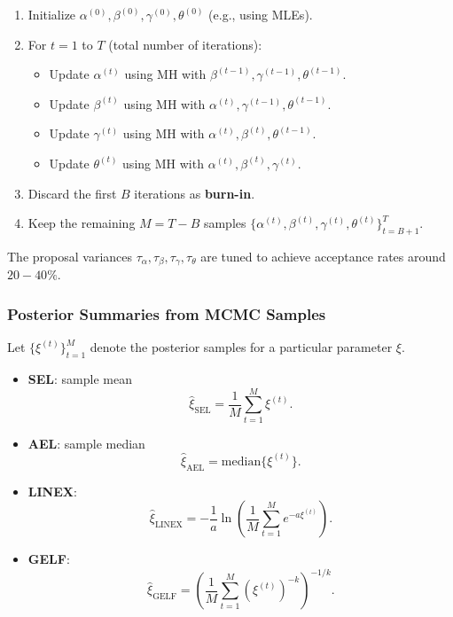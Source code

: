 \documentclass[12pt]{article}
\begin{document}
\begin{enumerate}
    \item Initialize \(\alpha^{(0)},\beta^{(0)},\gamma^{(0)},\theta^{(0)}\) (e.g., using MLEs).
    \item For \(t = 1\) to \(T\) (total number of iterations):
        \begin{itemize}
            \item Update \(\alpha^{(t)}\) using MH with \(\beta^{(t-1)},\gamma^{(t-1)},\theta^{(t-1)}\).
            \item Update \(\beta^{(t)}\) using MH with \(\alpha^{(t)},\gamma^{(t-1)},\theta^{(t-1)}\).
            \item Update \(\gamma^{(t)}\) using MH with \(\alpha^{(t)},\beta^{(t)},\theta^{(t-1)}\).
            \item Update \(\theta^{(t)}\) using MH with \(\alpha^{(t)},\beta^{(t)},\gamma^{(t)}\).
        \end{itemize}
    \item Discard the first \(B\) iterations as \textbf{burn-in}.
    \item Keep the remaining \(M = T-B\) samples \(\{\alpha^{(t)},\beta^{(t)},\gamma^{(t)},\theta^{(t)}\}_{t=B+1}^{T}\).
\end{enumerate}



The proposal variances \(\tau_{\alpha},\tau_{\beta},\tau_{\gamma},\tau_{\theta}\)
are tuned to achieve acceptance rates around \(20-40\%\).



\subsubsection{Posterior Summaries from MCMC Samples}



Let \(\{\xi^{(t)}\}_{t=1}^{M}\) denote the posterior samples for a particular
parameter \(\xi\).



\begin{itemize}
    \item \textbf{SEL}: sample mean
    \[
    \hat{\xi}_{\text{SEL}} = \frac{1}{M}\sum_{t=1}^{M} \xi^{(t)}.
    \]



    \item \textbf{AEL}: sample median
    \[
    \hat{\xi}_{\text{AEL}} = \text{median}\{\xi^{(t)}\}.
    \]



    \item \textbf{LINEX}:
    \[
    \hat{\xi}_{\text{LINEX}} = -\frac{1}{a}\ln\!\left( \frac{1}{M}\sum_{t=1}^{M} e^{-a\xi^{(t)}} \right).
    \]



    \item \textbf{GELF}:
    \[
    \hat{\xi}_{\text{GELF}} = \left( \frac{1}{M}\sum_{t=1}^{M} (\xi^{(t)})^{-k} \right)^{-1/k}.
    \]
\end{itemize}
\end{document}
